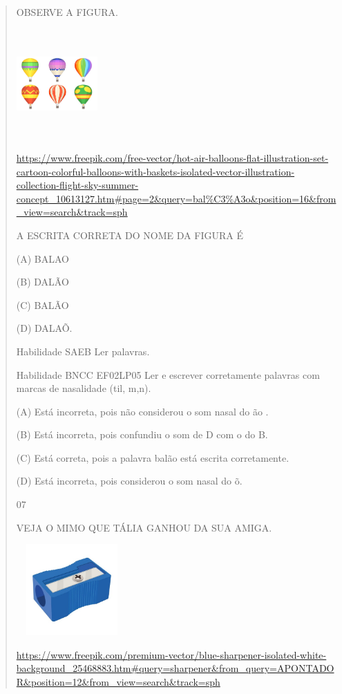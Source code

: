 \begin{verse}
{{{{{{{{{{{{{{{{{{{{OBSERVE A FIGURA.

\includegraphics[width=1.22569in,height=1.65417in]{media/image167.jpeg}

\url{https://www.freepik.com/free-vector/hot-air-balloons-flat-illustration-set-cartoon-colorful-balloons-with-baskets-isolated-vector-illustration-collection-flight-sky-summer-concept_10613127.htm\#page=2\&query=bal\%C3\%A3o\&position=16\&from_view=search\&track=sph}

A ESCRITA CORRETA DO NOME DA FIGURA É

(A) BALAO

(B) DALÃO

(C) BALÃO

(D) DALAÕ.

Habilidade SAEB Ler palavras.

Habilidade BNCC EF02LP05 Ler e escrever corretamente palavras com marcas
de nasalidade (til, m,n).

(A) Está incorreta, pois não considerou o som nasal do ão .

(B) Está incorreta, pois confundiu o som de D com o do B.

(C) Está correta, pois a palavra balão está escrita corretamente.

(D) Está incorreta, pois considerou o som nasal do õ.

\num{07}

VEJA O MIMO QUE TÁLIA GANHOU DA SUA AMIGA.

\includegraphics[width=1.67273in,height=1.37251in]{media/image168.jpeg}

\url{https://www.freepik.com/premium-vector/blue-sharpener-isolated-white-background_25468883.htm\#query=sharpener\&from_query=APONTADOR\&position=12\&from_view=search\&track=sph}

}}}}}}}}}}}}}}}}}}}}
\end{verse}
